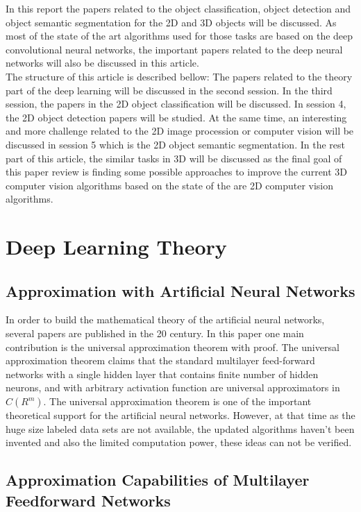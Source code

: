 \documentclass[a4paper,12pt]{article}
\begin{document}
In this report the papers related to the object classification, object detection and object semantic segmentation for the 2D and 3D objects will be discussed. As most of the state of the art algorithms used for those tasks are based on the deep convolutional neural networks, the important papers related to the deep neural networks will also be discussed in this article.\\
The structure of this article is described bellow: The papers related to the theory part of the deep learning will be discussed in the second session. In the third session, the papers in the 2D object classification will be discussed. In session 4, the 2D object detection papers will be studied. At the same time, an interesting and more challenge related to the 2D image procession or computer vision will be discussed in session 5 which is the 2D object semantic segmentation. In the rest part of this article, the similar tasks in 3D will be discussed as the final goal of this paper review is finding some possible approaches to improve the current 3D computer vision algorithms based on the state of the are 2D computer vision algorithms.\\

\section{Deep Learning Theory}
\subsection{Approximation with Artificial Neural Networks \cite{csaji2001}}
In order to build the mathematical theory of the artificial neural networks, several papers are published in the 20 century. In this paper one main contribution is the universal approximation theorem with proof. The universal approximation theorem claims \cite{csaji2001}  that the standard multilayer feed-forward networks with a single hidden layer that contains finite number of hidden neurons, and with arbitrary activation function are universal approximators in $C(R^m)$.  The universal approximation theorem is one of the important theoretical support for the artificial neural networks. However, at that time as the huge size labeled data sets are not available, the updated algorithms haven't been invented and also the limited computation power, these ideas can not be verified.


\subsection{Approximation Capabilities of Multilayer Feedforward Networks \cite{hornik1991} }
\end{document}
